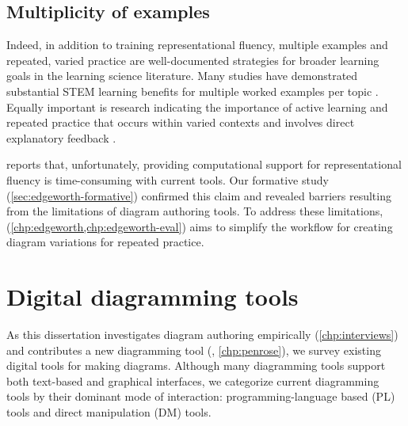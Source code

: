 \subsection{Multiplicity of examples}

Indeed, in addition to training representational fluency, multiple examples and repeated, varied practice are well-documented strategies for broader learning goals in the learning science literature. Many studies have demonstrated substantial STEM learning benefits for multiple worked examples per topic \cite{pashler_organizing_2007}. Equally important is research indicating the importance of active learning \cite{chi_icap_2014,deslauriers_measuring_2019} and repeated practice \cite{deliberatePractice,schnackenberg_learner_1998} that occurs within varied contexts \cite{PV94,rohrer_shuffling_2007} and involves direct explanatory feedback \cite{kellman_perceptual_2010}.

\citet{rau_conditions_2017} reports that, unfortunately, providing computational support for representational fluency is time-consuming with current tools. Our formative study (\cref{sec:edgeworth-formative}) confirmed this claim and revealed barriers resulting from the limitations of diagram authoring tools. To address these limitations, \Edgeworth (\cref{chp:edgeworth,chp:edgeworth-eval}) aims to simplify the workflow for creating diagram variations for repeated practice. 


\section{Digital diagramming tools}
\label{sec:related-systems}

As this dissertation investigates diagram authoring empirically (\cref{chp:interviews}) and contributes a new diagramming tool (\Penrose, \cref{chp:penrose}), we survey existing digital tools for making diagrams. Although many diagramming tools support both text-based and graphical interfaces, we categorize current diagramming tools by their dominant mode of interaction: programming-language based (PL) tools and direct manipulation (DM) tools. 

